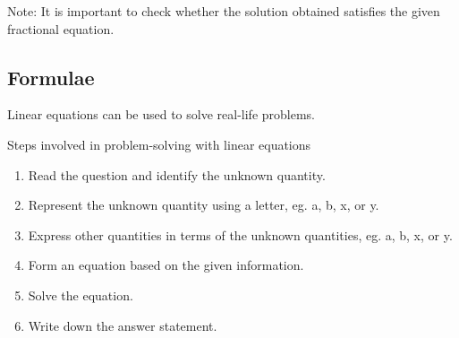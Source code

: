 \documentclass[../main]{subfiles}
\begin{document}
Note: It is important to check whether the solution obtained satisfies the given
fractional equation.

\subsection{Formulae}

Linear equations can be used to solve real-life problems.

Steps involved in problem-solving with linear equations
\begin{enumerate}
\item Read the question and identify the unknown quantity.
\item Represent the unknown quantity using a letter, eg. a, b, x, or y.
\item Express other quantities in terms of the unknown quantities, eg. a, b, x,
  or y.
\item Form an equation based on the given information.
\item Solve the equation.
\item Write down the answer statement.
  
\end{enumerate}
\end{document}
